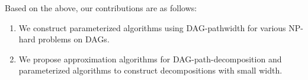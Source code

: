 \documentclass[runningheads]{llncs}
\theoremstyle{plain}
\theoremstyle{definition}
\begin{document}


Based on the above, our contributions are as follows:  
\begin{enumerate}
    \item We construct parameterized algorithms using DAG-pathwidth for various NP-hard problems on DAGs.  
    \item We propose approximation algorithms for DAG-path-decomposition and parameterized algorithms to construct decompositions with small width.  
\end{enumerate}
\end{document}

